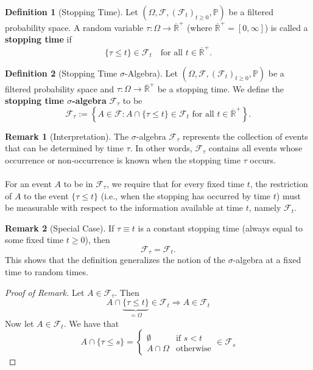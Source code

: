 \documentclass[11pt,a4paper]{article}
\theoremstyle{definition}
\newtheorem{definition}{Definition}[section]
\newtheorem{remark}{Remark}[section]
\begin{document}
\begin{definition}[Stopping Time]
Let $(\Omega, \mathcal{F}, (\mathcal{F}_t)_{t \geq 0}, \mathbb{P})$ be a filtered probability space. A random variable $\tau : \Omega \to \overline{\mathbb{R}}^+$ (where $\overline{\mathbb{R}}^+ = [0, \infty]$) is called a \textbf{stopping time} if
\[
\{\tau \leq t\} \in \mathcal{F}_t \quad \text{for all } t \in \overline{\mathbb{R}}^+.
\]
\end{definition}

\begin{definition}[Stopping Time $\sigma$-Algebra]
Let $(\Omega, \mathcal{F}, (\mathcal{F}_t)_{t \geq 0}, \mathbb{P})$ be a filtered probability space and $\tau : \Omega \to \overline{\mathbb{R}}^+$ be a stopping time. We define the \textbf{stopping time $\sigma$-algebra} $\mathcal{F}_\tau$ to be
\[
\mathcal{F}_\tau := \left\{ A \in \mathcal{F} : A \cap \{\tau \leq t\} \in \mathcal{F}_t \text{ for all } t \in \overline{\mathbb{R}}^+ \right\}.
\]
\end{definition}

\begin{remark}[Interpretation]
The $\sigma$-algebra $\mathcal{F}_\tau$ represents the collection of events that can be determined by time $\tau$. In other words, $\mathcal{F}_\tau$ contains all events whose occurrence or non-occurrence is known when the stopping time $\tau$ occurs.
~\\~\\
For an event $A$ to be in $\mathcal{F}_\tau$, we require that for every fixed time $t$, the restriction of $A$ to the event $\{\tau \leq t\}$ (i.e., when the stopping has occurred by time $t$) must be measurable with respect to the information available at time $t$, namely $\mathcal{F}_t$.
\end{remark}

\begin{remark}[Special Case]
If $\tau \equiv t$ is a constant stopping time (always equal to some fixed time $t \geq 0$), then
\[
\mathcal{F}_\tau = \mathcal{F}_t.
\]
This shows that the definition generalizes the notion of the $\sigma$-algebra at a fixed time to random times.
\end{remark}

\begin{proof}[Proof of Remark]
    Let $A \in \mathcal{F}_\tau$. Then \[
    A \cap \underbrace{\{\tau \le t\}}_{= \Omega} \in \mathcal{F}_t \Longrightarrow A \in \mathcal{F}_t
    \]
    Now let $A \in \mathcal{F}_t$. We have that \[
    A \cap \{\tau \le s\} = \begin{cases}
        \emptyset  & \text{if } s <t \\ A \cap \Omega & \text{otherwise}
    \end{cases} \in \mathcal{F}_s
    \]
\end{proof}
\end{document}
